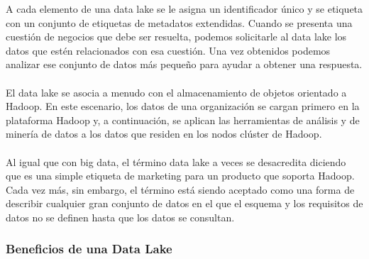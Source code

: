 \documentclass[11pt,a4paper]{article}
\begin{document}
		A cada elemento de una data lake se le asigna un identificador único y se etiqueta con un conjunto de etiquetas de metadatos extendidas. Cuando se presenta una cuestión de negocios que debe ser resuelta, podemos solicitarle al data lake los datos que estén relacionados con esa cuestión. Una vez obtenidos podemos analizar ese conjunto de datos más pequeño para ayudar a obtener una respuesta.\\
		\\
		El data lake se asocia a menudo con el almacenamiento de objetos orientado a Hadoop. En este escenario, los datos de una organización se cargan primero en la plataforma Hadoop y, a continuación, se aplican las herramientas de análisis y de minería de datos a los datos que residen en los nodos clúster de Hadoop.\\
		\\
		Al igual que con big data, el término data lake a veces se desacredita diciendo que es una simple etiqueta de marketing para un producto que soporta Hadoop. Cada vez más, sin embargo, el término está siendo aceptado como una forma de describir cualquier gran conjunto de datos en el que el esquema y los requisitos de datos no se definen hasta que los datos se consultan.\cite{DLake01:Online}
		
			\subsubsection{Beneficios de una Data Lake}
			
\end{document}
